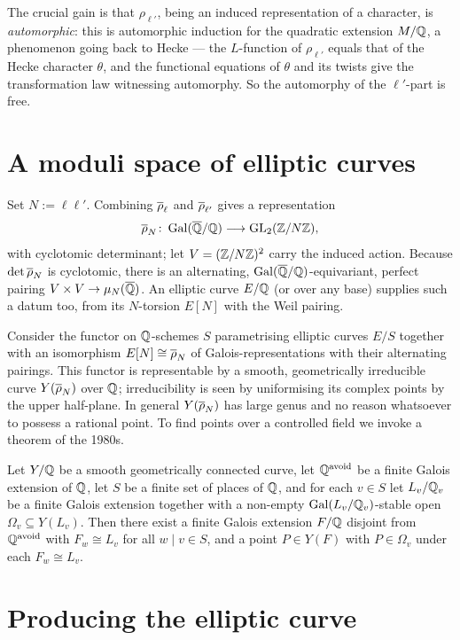 \documentclass[11pt]{article}
\begin{document}
The crucial gain is that $\rho_{\ell'}$, being an induced representation of a
character, is \emph{automorphic}: this is automorphic induction for the
quadratic extension $M/\mathbb{Q}$, a phenomenon going back to Hecke --- the
$L$-function of $\rho_{\ell'}$ equals that of the Hecke character $\theta$, and
the functional equations of $\theta$ and its twists give the transformation law
witnessing automorphy. So the automorphy of the $\ell'$-part is free.

\section{A moduli space of elliptic curves}

Set $N:=\ell\ell'$. Combining $\overline{\rho}_\ell$ and $\overline{\rho}_{\ell'}$ gives a
representation
\[
  \overline{\rho}_N\colon\operatorname{Gal}(\overline{\mathbb{Q}}/\mathbb{Q})\longrightarrow\operatorname{GL}_2(\mathbb{Z}/N\mathbb{Z}),
\]
with cyclotomic determinant; let $V=(\mathbb{Z}/N\mathbb{Z})^2$ carry the induced action.
Because $\det\overline{\rho}_N$ is cyclotomic, there is an alternating,
$\operatorname{Gal}(\overline{\mathbb{Q}}/\mathbb{Q})$-equivariant, perfect pairing $V\times V\to\mu_N(\overline{\mathbb{Q}})$. An elliptic curve
$E/\mathbb{Q}$ (or over any base) supplies such a datum too, from its $N$-torsion
$E[N]$ with the Weil pairing.

Consider the functor on $\mathbb{Q}$-schemes $S$ parametrising elliptic curves $E/S$
together with an isomorphism $E[N]\cong\overline{\rho}_N$ of Galois-representations with
their alternating pairings. This functor is representable by a smooth,
geometrically irreducible curve $Y(\overline{\rho}_N)$ over $\mathbb{Q}$; irreducibility is seen
by uniformising its complex points by the upper half-plane. In general
$Y(\overline{\rho}_N)$ has large genus and no reason whatsoever to possess a rational
point. To find points over a controlled field we invoke a theorem of the 1980s.

\begin{theorem}\label{thm:mb}
Let $Y/\mathbb{Q}$ be a smooth geometrically connected curve, let $\mathbb{Q}^{\mathrm{avoid}}$
be a finite Galois extension of $\mathbb{Q}$, let $S$ be a finite set of places of $\mathbb{Q}$,
and for each $v\in S$ let $L_v/\mathbb{Q}_v$ be a finite Galois extension together with a
non-empty $\operatorname{Gal}(L_v/\mathbb{Q}_v)$-stable open $\Omega_v\subseteq Y(L_v)$. Then there
exist a finite Galois extension $F/\mathbb{Q}$ disjoint from $\mathbb{Q}^{\mathrm{avoid}}$ with
$F_w\cong L_v$ for all $w\mid v\in S$, and a point $P\in Y(F)$ with
$P\in\Omega_v$ under each $F_w\cong L_v$.
\end{theorem}

\section{Producing the elliptic curve}
\end{document}
